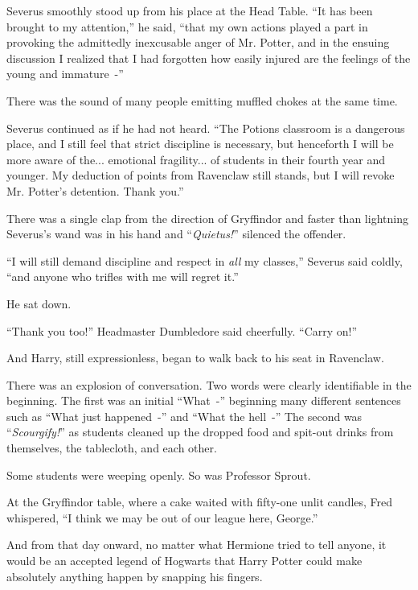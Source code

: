 Severus smoothly stood up from his place at the Head Table. ``It has been brought to my attention,'' he said, ``that my own actions played a part in provoking the admittedly inexcusable anger of Mr. Potter, and in the ensuing discussion I realized that I had forgotten how easily injured are the feelings of the young and immature~-''

There was the sound of many people emitting muffled chokes at the same time.

Severus continued as if he had not heard. ``The Potions classroom is a dangerous place, and I still feel that strict discipline is necessary, but henceforth I will be more aware of the... emotional fragility... of students in their fourth year and younger. My deduction of points from Ravenclaw still stands, but I will revoke Mr. Potter's detention. Thank you.''

There was a single clap from the direction of Gryffindor and faster than lightning Severus's wand was in his hand and ``\emph{Quietus!}'' silenced the offender.

``I will still demand discipline and respect in \emph{all} my classes,'' Severus said coldly, ``and anyone who trifles with me will regret it.''

He sat down.

``Thank you too!'' Headmaster Dumbledore said cheerfully. ``Carry on!''

And Harry, still expressionless, began to walk back to his seat in Ravenclaw.

There was an explosion of conversation. Two words were clearly identifiable in the beginning. The first was an initial ``What~-'' beginning many different sentences such as ``What just happened~-'' and ``What the hell~-'' The second was ``\emph{Scourgify!}'' as students cleaned up the dropped food and spit-out drinks from themselves, the tablecloth, and each other.

Some students were weeping openly. So was Professor Sprout.

At the Gryffindor table, where a cake waited with fifty-one unlit candles, Fred whispered, ``I think we may be out of our league here, George.''

And from that day onward, no matter what Hermione tried to tell anyone, it would be an accepted legend of Hogwarts that Harry Potter could make absolutely anything happen by snapping his fingers.
